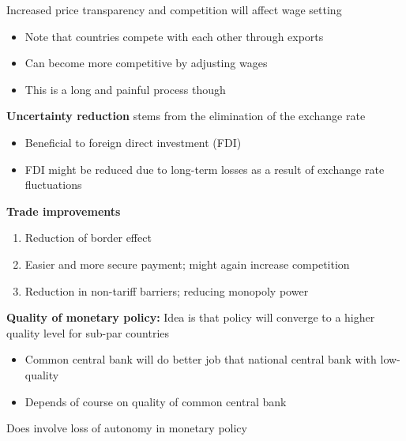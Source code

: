 \documentclass{beamer}
\begin{document}
\begin{frame}
  Increased price transparency and competition will affect wage setting
    \begin{itemize}
    \item Note that countries compete with each other through exports
    \item Can become more competitive by adjusting wages   
    \item This is a long and painful process though
  \end{itemize}  
\end{frame}

\begin{frame}
  \textbf{Uncertainty reduction} stems from the elimination of the exchange rate
  \begin{itemize}
    \item Beneficial to foreign direct investment (FDI)
    \item FDI might be reduced due to long-term losses as a result of exchange rate fluctuations
  \end{itemize}
\end{frame}

\begin{frame}
  \textbf{Trade improvements}
  \begin{enumerate}
    \item Reduction of border effect
    \item Easier and more secure payment; might again increase competition
    \item Reduction in non-tariff barriers; reducing monopoly power
  \end{enumerate}
\end{frame}

\begin{frame}
  \textbf{Quality of monetary policy:} Idea is that policy will converge to a higher quality level for sub-par countries
  \begin{itemize}
    \item Common central bank will do better job that national central bank with low-quality
    \item Depends of course on quality of common central bank
  \end{itemize}
  \medskip
  Does involve loss of autonomy in monetary policy
\end{frame}
\end{document}
